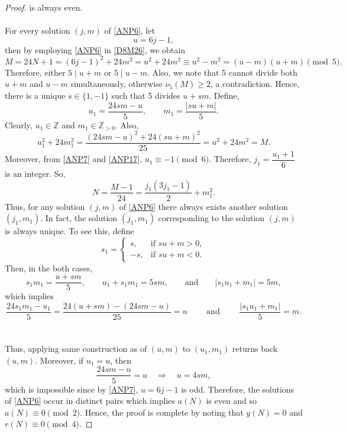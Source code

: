\documentclass[12pt]{article}
\numberwithin{equation}{section}
\theoremstyle{definition}
\theoremstyle{remark}
\numberwithin{equation}{section}
\begin{document}
\begin{proof}
is always even.\\\\
For every solution $(j,m)$ of \eqref{ANP6}, let
\begin{equation}\label{ANP7}
u=6j-1,
\end{equation}
then by employing \eqref{ANP6} in \eqref{D8M26}, we obtain
\begin{equation*}
M
=24N+1 =(6j-1)^2+24m^2=u^2+24m^2\equiv u^2-m^2=(u-m)(u+m)\pmod 5.
\end{equation*}
Therefore,  either $5\mid u+m$ or $5\mid u-m$. Also, we note that 5 cannot divide both $u+m$ and $u-m$ simultaneously, otherwise  $\nu_5(M)\ge 2$, a contradiction.
Hence, there is a
unique $s\in\{1,-1\}$ such that 5 divides $u+sm$.
Define, 
\begin{equation}\label{ANP17}
u_1=\dfrac{24sm-u}{5},
\qquad
m_1=\dfrac{|su+m|}{5}.
\end{equation}
Clearly, $u_1\in\mathbb Z$ and $m_1\in\mathbb Z_{>0}$. Also, 
\begin{equation*}
u_1^2+24m_1^2=
\dfrac{(24sm-u)^2+24(su+m)^2}{25} =u^2+24m^2 =M.
\end{equation*}
Moreover, from \eqref{ANP7} and \eqref{ANP17}, 
$u_1\equiv-1\pmod{6}.$
Therefore,
$
j_1=\dfrac{u_1+1}{6}
$ is an integer. So, 
\begin{equation*}
N
=\dfrac{M-1}{24} =\dfrac{j_1(3j_1-1)}{2}+m_1^2.
\end{equation*}
Thus, for any solution $(j, m)$ of \eqref{ANP6} there always exists another  solution $(j_1,m_1)$. In fact, the solution $(j_1, m_1)$ corresponding to the solution $(j, m)$ is always unique. To see this,
define
$$s_1=
\begin{cases}
s,  & \text{if } su+m>0,\\
-s, & \text{if } su+m<0.
\end{cases}$$
Then, in the both cases,
$$s_1m_1=\dfrac{u+sm}{5},
\qquad
u_1+s_1m_1=5sm,
\qquad\mbox{and}\qquad 
|s_1u_1+m_1|=5m, $$
which implies
$$\dfrac{24s_1m_1-u_1}{5}
=\dfrac{24(u+sm)-(24sm-u)}{25}
=u \qquad \text{ and }\qquad \dfrac{|s_1u_1+m_1|}{5}
=m.$$\\\\
Thus, applying same construction as of $(u,m)$ to $(u_1,m_1)$ returns back $(u,m)$. Moreover, if $u_1=u$, then
$$\dfrac{24sm-u}{5}=u
\quad\Longrightarrow\quad
u=4sm,$$
which is impossible since by  \eqref{ANP7}, $u=6j-1$ is odd. Therefore, the solutions  of  \eqref{ANP6} occur in distinct pairs which implies $a(N)$ is even and so $a(N)\equiv 0\pmod 2$. Hence, the proof is complete by noting that $y(N)=0$ and $r(N)\equiv 0\pmod 4$.
\end{proof}
\end{document}
